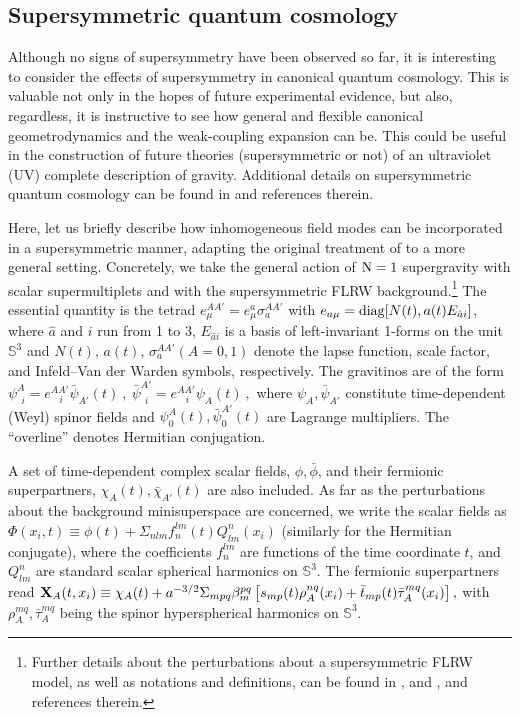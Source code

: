 \documentclass[12pt]{iopart}
\begin{document}
\subsection{\label{sec:sqc}Supersymmetric quantum cosmology}
Although no signs of supersymmetry have been observed so far, it is interesting to consider the effects of supersymmetry in canonical quantum cosmology. This is valuable not only in the hopes of future experimental evidence, but also, regardless, it is instructive to see how general and flexible canonical geometrodynamics and the weak-coupling expansion can be. This could be useful in the construction of future theories (supersymmetric or not) of an ultraviolet (UV) complete description of gravity. Additional details on supersymmetric quantum cosmology can be found in \citet{kiefer2005semiclassical,kiefer2006quantum,VargasMoniz:2010zz,VargasMoniz:2010zza} and references therein.

Here, let us 
briefly describe how  inhomogeneous field modes can be 
incorporated 
in a supersymmetric manner, adapting the original treatment of \citet{HalliwellHawking} to a more general setting. Concretely, we take the general 
action of  ${\rm N}=1$ supergravity with
 scalar supermultiplets and with the supersymmetric FLRW background.\footnote{Further details about the perturbations about a supersymmetric FLRW model, as well as notations and definitions, can be found in \citet{Moniz:1998zz}, \citet{Moniz:1998zz} 
and \citet{kiefer2005semiclassical},  and references therein.} The essential quantity is the tetrad $e^{AA'}_\mu = e^a_\mu \sigma_a^{AA'}$ with 
$ 
e_{a\mu} = {\rm diag} [N(t), a (t) E_{\hat a i} ]$, 
where   $ \hat a $ and $ i $ run from 1 to 3, 
$ E_{\hat a i} $ is a basis of left-invariant 1-forms on the unit $ \mathbb{S}^3 $
and $N(t)$, $a(t)$, $\sigma_a^{AA'} (A = 0,1)$ denote 
the lapse function, scale factor, and Infeld--Van der Warden symbols, respectively. The gravitinos are of the form $
\psi^A_{~~i} = e^{AA'}_{~~~~i} \bar\psi_{A'} (t) ~, ~
\bar\psi^{A'}_{~~i} = e^{AA'}_{~~~~i} \psi_A (t) ~, 
$
where  
$\psi_A, \bar\psi_{A'}$ constitute  time-dependent (Weyl)  spinor fields and 
$\psi^A_0 (t), \bar \psi_0^{A'} (t)$ are Lagrange multipliers. The ``overline'' denotes Hermitian conjugation.
  
A  set of time-dependent  complex scalar fields, 
$\phi, \bar \phi$, and their 
fermionic superpartners, $\chi_A (t), \bar \chi_{A'} (t)$ are also included. As far as the perturbations about the background 
minisuperspace are concerned, 
we
write the scalar fields as 
$\Phi (x_i, t)  \equiv  \phi (t) + \Sigma_{nlm} f_{n}^{lm} (t) 
Q^{n}_{lm} (x_i)$ (similarly for the Hermitian conjugate), 
where 
the coefficients $f_{n}^{lm}$ are functions 
of the time coordinate $t$, and 
$Q^{n}_{lm}$ are standard scalar spherical harmonics on 
$\mathbb{S}^3$. The fermionic superpartners read 
$
{\bf X}_A (t, x_i)  \equiv  \chi_A (t) + a^{-3/2} \Sigma_{mpq} 
\beta_m^{pq} \left[ s_{mp} (t) \rho^{nq}_A (x_i) + 
\bar t_{mp} (t) \bar \tau_A^{mq} (x_i) \right],
$ with  $\rho^{mq}_A, 
 \bar \tau^{mq}_{A}$ being the 
spinor hyperspherical harmonics on $\mathbb{S}^3$. 
\end{document}
